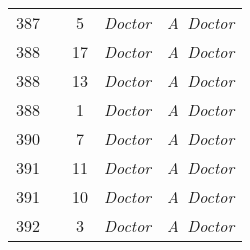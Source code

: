 \documentclass[a4paper,11pt]{article}
\numberwithin{equation}{section}
\begin{document}
\begin{center}
\begin{tabular}{|c|c|c|c|c|}
    387 & & \hphantom{0}5 & \textit{Doctor} & \textit{A~Doctor} \\
    388 & & 17 & \textit{Doctor} & \textit{A~Doctor} \\
    388 & & 13 & \textit{Doctor} & \textit{A~Doctor} \\
    388 & & \hphantom{0}1 & \textit{Doctor} & \textit{A~Doctor} \\
    390 & & \hphantom{0}7 & \textit{Doctor} & \textit{A~Doctor} \\
    391 & & 11 & \textit{Doctor} & \textit{A~Doctor} \\
    391 & & 10 & \textit{Doctor} & \textit{A~Doctor} \\
    392 & & \hphantom{0}3 & \textit{Doctor} & \textit{A~Doctor} \\
    \hline
  \end{tabular}





  \newpage


\end{center}
\end{document}
